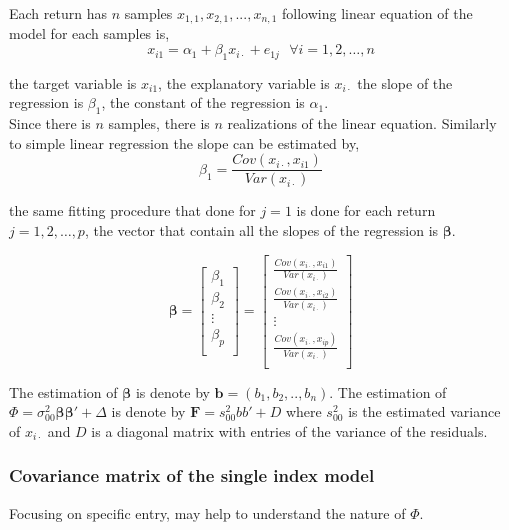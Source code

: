 \documentclass[letterpaper]{article}
\begin{document}
	Each return has \(n\) samples \(x_{1,1}, x_{2,1}, ..., x_{n,1}\) following linear equation of the model for each samples is,
	\[x_{i1} = \alpha_{1} +\beta_{1}x_{i\cdot} + e_{1j} \  \  \ \forall i =1,2,\dots, n \]
	
	the target variable is \(x_{i1}\), the explanatory variable is \(x_{i\cdot}\) the slope of the regression is \(\beta_1\), the constant of the regression is \(\alpha_1\).\\
	
	Since there is \(n\) samples, there is \(n\) realizations of the linear equation. Similarly to simple linear regression the slope can be estimated by, 
	\[\beta_1 = \frac{Cov(x_{i\cdot}, x_{i1})}{Var(x_{i\cdot})} \] 

	the same fitting procedure that done for \(j=1\) is done for each return \(j=1,2,\dots, p\), the vector that contain all the slopes of the regression is \(\boldsymbol{\beta}\).
	 
	\[\boldsymbol{\beta} = 
	\begin{bmatrix}
	\beta_{1} \\
	\beta_{2} \\
	\vdots \\
	\beta_{p} \\
	\end{bmatrix}
	=
	\begin{bmatrix}
	\frac{ Cov(x_{i\cdot}, x_{i1}) }{Var(x_{i\cdot})}\\
	\frac{ Cov(x_{i\cdot}, x_{i2}) }{Var(x_{i\cdot})} \\
	\vdots \\
	\frac{ Cov(x_{i\cdot}, x_{ip}) }{Var(x_{i\cdot})} \\
	\end{bmatrix}
	 \]
	 
	The estimation of \(\boldsymbol{\beta}\) is denote by \( \boldsymbol{b} = (b_1, b_2, .., b_n)\). The estimation of \(\Phi = \sigma_{00}^{2}\boldsymbol{\beta \beta'} +\Delta \) is denote by \(\boldsymbol{F} = s_{00}^{2}bb' + D \) where \(s_{00}^{2}\) is the estimated variance of \(x_{i\cdot}\) and \(D\) is a diagonal matrix with entries of the variance of the residuals.\\  
	

	
	\subsubsection{Covariance matrix of the single index model}
	Focusing on specific entry, may help to understand the nature of \(\Phi\).
	
\end{document}

